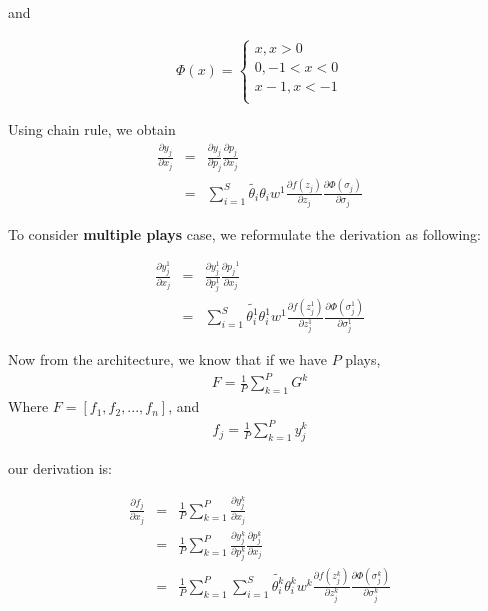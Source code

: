 \documentclass[11pt]{article}
\begin{document}
and

\begin{eqnarray}
\Phi(x) =
        \begin{cases}
        x, x > 0 \\
        0, -1 < x < 0 \\
        x-1, x < -1 \\
        \end{cases}

\end{eqnarray}

Using chain rule, we obtain
\begin{eqnarray}
\frac{\partial y_{j}}{\partial x_{j}} &=& \frac{\partial y_{j}}{\partial p_{j}} \frac{\partial p_{j}}{\partial x_{j}} \\
                                      &=& \sum_{i=1}^{S} \tilde{\theta_{i}} \theta_{i} w^{1} \frac{\partial f(z_j)}{\partial z_{j}} \frac{\partial{\Phi(\sigma_{j})}}{\partial{\sigma_{j}}}
\end{eqnarray}


To consider \textbf{multiple plays} case, we reformulate the derivation as following:

\begin{eqnarray}
\frac{\partial {y_{j}^{1}}}{\partial x_{j}} &=& \frac{\partial{y_{j}^{1}}}{\partial{p_{j}^{1}}} \frac{\partial{ p_{j}}^{1}}{\partial x_{j}} \\
                                      &=& \sum_{i=1}^{S} \tilde{\theta_{i}^{1}} \theta_{i}^{1} w^{1} \frac{\partial f(z_{j}^{1})}{\partial z_{j}^{1}} \frac{\partial{\Phi(\sigma_{j}^{1})}}{\partial{\sigma_{j}^{1}}}
\end{eqnarray}


Now from the architecture, we know that if we have \(P\) plays,
\begin{eqnarray}
F = \frac{1}{P} \sum_{k=1}^{P} G^{k}
\end{eqnarray}
Where \(F=[f_1, f_2, ..., f_n]\),
and
\begin{eqnarray}
f_{j} = \frac{1}{P} \sum_{k=1}^{P} y_{j}^{k}
\end{eqnarray}

our derivation is:

\begin{eqnarray}
\frac{\partial f_{j}}{\partial x_{j}} &=& \frac{1}{P} \sum_{k=1}^{P} \frac{\partial {{y_{j}^{k}}}}{\partial {{x_{j}}}} \\
               &=& \frac{1}{P} \sum_{k=1}^{P} \frac{\partial {y_{j}^{k}}}{\partial {p_{j}^{k}}} \frac{\partial {p_{j}^{k}}}{\partial {x_{j}}} \\
               &=& \frac{1}{P} \sum_{k=1}^{P}  \sum_{i=1}^{S} \tilde{\theta_{i}^{k}} \theta_{i}^{k} w^{k} \frac{\partial f(z_{j}^{k})}{\partial z_{j}^{k}} \frac{\partial{\Phi(\sigma_{j}^{k})}}{\partial{\sigma_{j}^{k}}}
\end{eqnarray}
\end{document}
